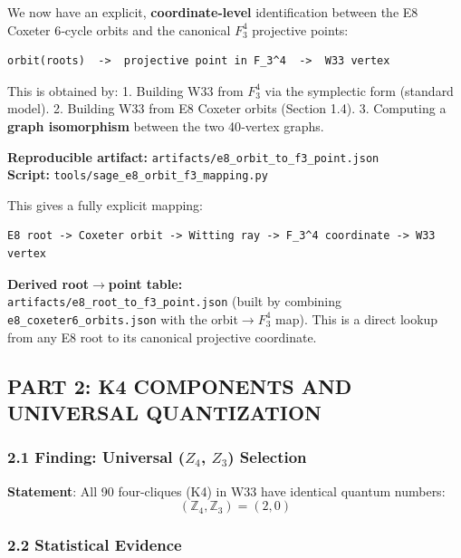 \documentclass[11pt]{article}
\begin{document}
We now have an explicit, \textbf{coordinate-level} identification
between the E8 Coxeter 6‑cycle orbits and the canonical \(F_{3}^{4}\)
projective points:

\begin{verbatim}
orbit(roots)  ->  projective point in F_3^4  ->  W33 vertex
\end{verbatim}

This is obtained by: 1. Building W33 from \(F_{3}^{4}\) via the
symplectic form (standard model). 2. Building W33 from E8 Coxeter orbits
(Section 1.4). 3. Computing a \textbf{graph isomorphism} between the two
40‑vertex graphs.

\textbf{Reproducible artifact:}
\texttt{artifacts/e8\_orbit\_to\_f3\_point.json}\\
\textbf{Script:} \texttt{tools/sage\_e8\_orbit\_f3\_mapping.py}

This gives a fully explicit mapping:

\begin{verbatim}
E8 root -> Coxeter orbit -> Witting ray -> F_3^4 coordinate -> W33 vertex
\end{verbatim}

\textbf{Derived root\ensuremath{\rightarrow}point table:}\\
\texttt{artifacts/e8\_root\_to\_f3\_point.json} (built by combining
\texttt{e8\_coxeter6\_orbits.json} with the
orbit\ensuremath{\rightarrow}\(F_{3}^{4}\) map). This is a direct lookup
from any E8 root to its canonical projective coordinate.

\subsection{PART 2: K4 COMPONENTS AND UNIVERSAL
QUANTIZATION}\label{part-2-k4-components-and-universal-quantization}

\subsubsection{\texorpdfstring{2.1 Finding: Universal (\(Z_{4}\),
\(Z_{3}\))
Selection}{2.1 Finding: Universal (Z\_\{4\}, Z\_\{3\}) Selection}}\label{finding-universal-z_4-z_3-selection}

\textbf{Statement}: All 90 four-cliques (K4) in W33 have identical
quantum numbers: \[\boxed{(\mathbb{Z}_4, \mathbb{Z}_3) = (2, 0)}\]

\subsubsection{2.2 Statistical Evidence}\label{statistical-evidence}
\end{document}
